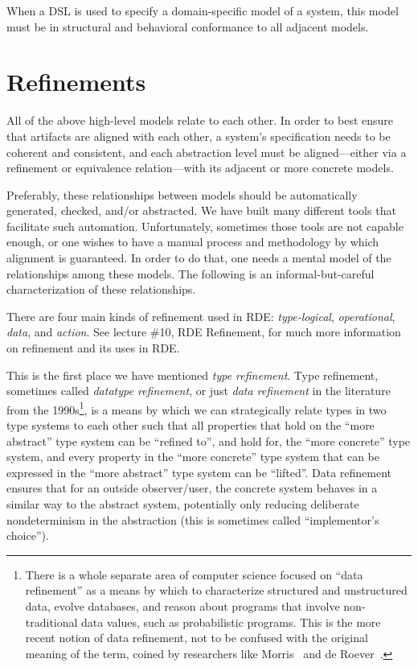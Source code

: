 \documentclass[10pt,letterpaper]{article}
\begin{document}
When a DSL is used to specify a domain-specific model of a system, this model must be in structural and behavioral conformance to all adjacent models.

\section{Refinements}
\label{refinements}

All of the above high-level models relate to each other. In order to best ensure that artifacts are aligned with each other, a system's specification needs to be coherent and consistent, and each abstraction level must be aligned---either via a refinement or equivalence relation---with its adjacent or more concrete models.

Preferably, these relationships between models should be automatically generated, checked, and/or abstracted. We have built many different tools that facilitate such automation. Unfortunately, sometimes those tools are not capable enough, or one wishes to have a manual process and methodology by which alignment is guaranteed. In order to do that, one needs a mental model of the relationships among these models. The following is an informal-but-careful characterization of these relationships.

There are four main kinds of refinement used in RDE: \emph{type-logical}, \emph{operational}, \emph{data}, and \emph{action}. See lecture \#10, RDE Refinement, for much more information on refinement and its uses in RDE.

This is the first place we have mentioned \emph{type refinement}. Type refinement, sometimes called \emph{datatype refinement}, or just \emph{data refinement} in the literature from the 1990s\footnote{There is a whole separate area of computer science focused on ``data refinement'' as a means by which to characterize structured and unstructured data, evolve databases, and reason about programs that involve non-traditional data values, such as probabilistic programs.  This is the more recent notion of data refinement, not to be confused with the original meaning of the term, coined by researchers like Morris~\cite{MorrisLawsData1989} and de Roever~\cite{RoeverEngelhardtDataRefinement2008}.}, is a means by which we can strategically relate types in two type systems to each other such that all properties that hold on the ``more abstract'' type system can be ``refined to'', and hold for, the ``more concrete'' type system, and every property in the ``more concrete'' type system that can be expressed in the ``more abstract'' type system can be ``lifted''. Data refinement ensures that for an outside observer/user, the concrete system behaves in a similar way to the abstract system, potentially only reducing deliberate nondeterminism in the abstraction (this is sometimes called ``implementor's choice'').
\end{document}
